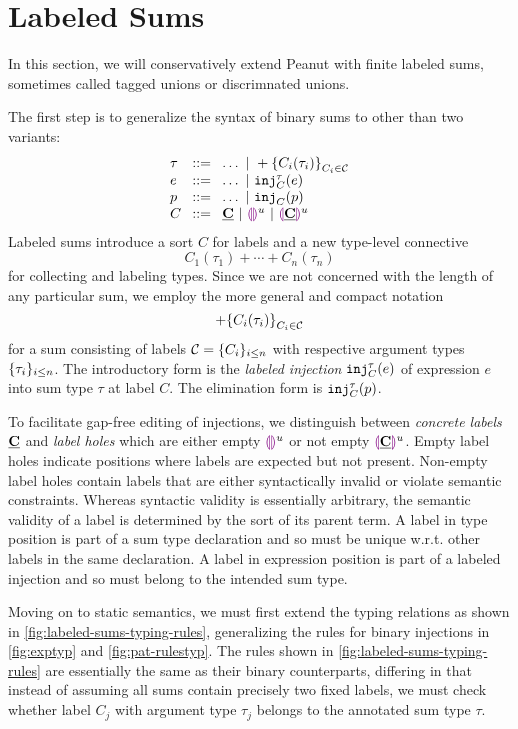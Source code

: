 \section{Labeled Sums}\label{sec:labeledsums}

In this section, we will conservatively extend Peanut with finite labeled sums,
sometimes called tagged unions or discrimnated unions.

The first step is to generalize the syntax of binary sums to other than two variants:
\[
  \arraycolsep=4pt\begin{array}{lll}
    \tau & ::= & \ldots ~\vert~ \tlabeledsum{C_i(\tau_i)}_{C_i \in \tagset} \\
    e    & ::= & \ldots ~\vert~ \hinj{C}{\tau}{e}                           \\
    p    & ::= & \ldots ~\vert~ \hinjp{C}{p}                                \\
    C    & ::= & \tagC ~\vert~ \tagehole{u} ~\vert~ \taghole{\tagC}{u}
  \end{array}
\]
Labeled sums introduce a sort $C$ for labels and a new type-level connective
\[ C_1(\tau_1) + \cdots + C_n(\tau_n) \]
for collecting and labeling types.
Since we are not concerned with the length of any particular sum,
we employ the more general and compact notation
\[+\mathopen{}\left\{C_i(\tau_i)\right\}_{C_i \in \mathcal{C}}\]
for a sum consisting of labels $\mathcal{C} = \{C_i\}_{i \leq n}$ with respective argument types $\{\tau_i\}_{i \leq n}$.
The introductory form is the \emph{labeled injection} $\mathtt{inj}_{C}^{\tau}({e})$ of expression $e$ into sum type $\tau$ at label $C$.
The elimination form is $\mathtt{inj}_{C}^{\tau}({p})$.

To facilitate gap-free editing of injections, we distinguish between \emph{concrete labels} $\underline{\mathbf{C}}$
and \emph{label holes} which are either empty $\textcolor{violet}{\llparenthesis}\textcolor{violet}{\rrparenthesis}^{u}$ or not empty $\textcolor{violet}{\llparenthesis}\underline{\mathbf{C}}\textcolor{violet}{\rrparenthesis}^{u}$.
Empty label holes indicate positions where labels are expected but not present.
Non-empty label holes contain labels that are either syntactically invalid or violate semantic constraints.
Whereas syntactic validity is essentially arbitrary, the semantic validity of a label is determined by the sort of its parent term.
A label in type position is part of a sum type declaration and so must be unique w.r.t. other labels in the same declaration.
A label in expression position is part of a labeled injection and so must belong to the intended sum type.


Moving on to static semantics, we must first extend the typing relations as shown in \autoref{fig:labeled-sums-typing-rules},
generalizing the rules for binary injections in \autoref{fig:exptyp} and \autoref{fig:pat-rulestyp}.
The rules shown in \autoref{fig:labeled-sums-typing-rules} are essentially the same as their binary counterparts,
differing in that instead of assuming all sums contain precisely two fixed labels,
we must check whether label $C_j$ with argument type $\tau_j$ belongs to the annotated sum type $\tau$.

